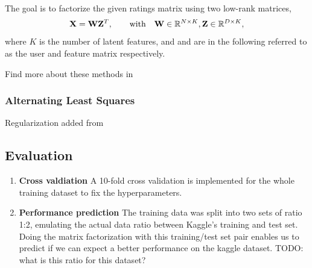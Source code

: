 The goal is to factorize the given ratings matrix using two low-rank matrices, 
\begin{equation}
  \mathbf{X} = \mathbf{W}\mathbf{Z}^T ,\hspace{2em} \text{with} \hspace{1em} \mathbf{W} \in\mathbb{R}^{N \times K},
  \mathbf{Z} \in\mathbb{R}^{D \times K}, 
\end{equation}
where $K$ is the number of latent features, and  and  are in the following
referred to as the user and feature matrix respectively.

Find more about these methods in \cite{Aberger2009}

\subsubsection{Alternating Least Squares}

Regularization added from \cite{Zhou2008}

\subsection{Evaluation}

\begin{enumerate}
  \item \textbf{Cross valdiation} A 10-fold cross validation is implemented
    for the whole training dataset to fix the hyperparameters. 

  \item \textbf{Performance prediction} The training data was split into two
    sets of ratio 1:2, emulating the actual data ratio between Kaggle's training
    and test set. Doing the matrix factorization with this training/test set
    pair enables us to predict if we can expect a better performance on the
    kaggle dataset.  
    TODO: what is this ratio for this dataset? 
\end{enumerate}

